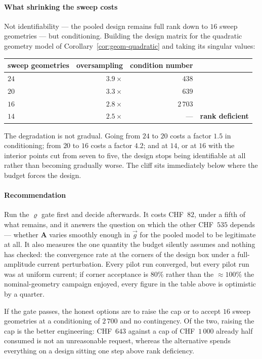 \documentclass[11pt,a4paper]{article}
\newcommand{\vect}[1]{\mathbf{#1}}
\theoremstyle{plain}
\theoremstyle{definition}
\theoremstyle{remark}
\begin{document}
\paragraph{What shrinking the sweep costs}
Not identifiability --- the pooled design remains full rank down to $16$ sweep
geometries --- but conditioning. Building the design matrix for the quadratic
geometry model of Corollary~\ref{cor:geom-quadratic} and taking its singular
values:
\begin{center}
\small
\begin{tabular}{@{}lrrl@{}}
\toprule
sweep geometries & oversampling & condition number & \\
\midrule
$24$ & $3.9\times$ & $438$ & \\
$20$ & $3.3\times$ & $639$ & \\
$16$ & $2.8\times$ & $2\,703$ & \\
$14$ & $2.5\times$ & --- & \textbf{rank deficient} \\
\bottomrule
\end{tabular}
\end{center}
The degradation is not gradual. Going from $24$ to $20$ costs a factor $1.5$ in
conditioning; from $20$ to $16$ costs a factor $4.2$; and at $14$, or at $16$
with the interior points cut from seven to five, the design stops being
identifiable at all rather than becoming gradually worse. The cliff sits
immediately below where the budget forces the design.

\paragraph{Recommendation}
Run the $\varrho$ gate first and decide afterwards. It costs CHF~$82$, under a
fifth of what remains, and it answers the question on which the other CHF~$535$
depends --- whether $\vect{A}$ varies smoothly enough in $\vec g$ for the pooled
model to be legitimate at all. It also measures the one quantity the budget
silently assumes and nothing has checked: the convergence rate at the corners of
the design box under a full-amplitude current perturbation. Every pilot run
converged, but every pilot run was at uniform current; if corner acceptance is
$80\%$ rather than the $\approx100\%$ the nominal-geometry campaign enjoyed,
every figure in the table above is optimistic by a quarter.

If the gate passes, the honest options are to raise the cap or to accept
$16$ sweep geometries at a conditioning of $2\,700$ and no contingency. Of the
two, raising the cap is the better engineering: CHF~$643$ against a cap of
CHF~$1\,000$ already half consumed is not an unreasonable request, whereas the
alternative spends everything on a design sitting one step above rank
deficiency.
\end{document}
